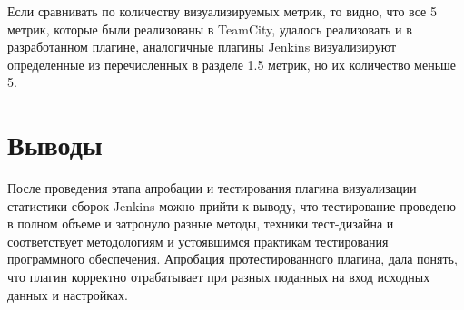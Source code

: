 Если сравнивать по количеству визуализируемых метрик, то видно, что все 5 метрик, которые были реализованы в TeamCity, удалось реализовать и в разработанном плагине, аналогичные плагины Jenkins визуализируют определенные из перечисленных в разделе 1.5 метрик, но их количество меньше 5.


 
 
\section{Выводы} \label{ch4:sec3}

После проведения этапа апробации и тестирования плагина визуализации статистики сборок Jenkins можно прийти к выводу, что тестирование проведено в полном объеме и затронуло разные методы, техники тест-дизайна и соответствует методологиям и устоявшимся практикам тестирования программного обеспечения. Апробация протестированного плагина, дала понять, что плагин корректно отрабатывает при разных поданных на вход исходных данных и настройках.






%
%

%
%







